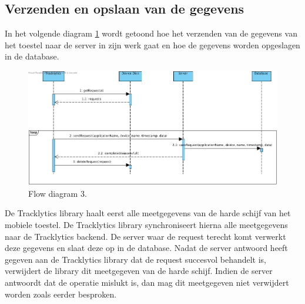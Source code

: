 \subsection{Verzenden en opslaan van de gegevens} \label{sec:VerzendenEnOpslaanVanGegevens}
In het volgende diagram \ref{fig:flow3} wordt getoond hoe het verzenden van de gegevens van het toestel naar de server in zijn werk gaat en hoe de gegevens worden opgeslagen in de database. \\
\begin{figure}[!h]
  \centering
  \includegraphics[scale=0.4]{Afbeeldingen/Architectuur/FlowDiagram3}
  \caption{Flow diagram 3.}
  \label{fig:flow3}
\end{figure}


De Tracklytics library haalt eerst alle meetgegevens van de harde schijf van het mobiele toestel. De Tracklytics library synchroniseert hierna alle meetgegevens naar de Tracklytics backend. De server waar de request terecht komt verwerkt deze gegevens en slaat deze op in de database. Nadat de server antwoord heeft gegeven aan de Tracklytics library dat de request succesvol behandelt is, verwijdert de library dit meetgegeven van de harde schijf. Indien de server antwoordt dat de operatie mislukt is, dan mag dit meetgegeven niet verwijdert worden zoals eerder besproken.







